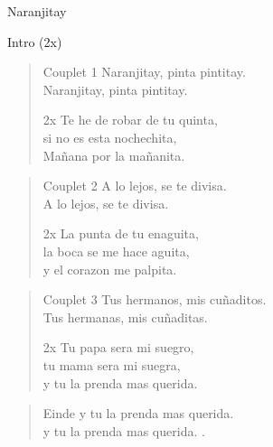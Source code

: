 \begin{song}[huayno]{Naranjitay}

\begin{instrumental}{Intro (2x)}
\measure{}\measure{}\measure{}\measure{}\measure{}\measure{}
\measure{}\measure{}
\end{instrumental}


\begin{verse}{Couplet 1}
Naranjitay, pinta pintitay.\\
Naranjitay, pinta pintitay.\\
\begin{sidenote}{2x}
Te he de robar de tu quinta,\\
si no es esta nochechita,\\
Mañana por la mañanita.\phantom{xxxx}
\end{sidenote}
\end{verse}


\begin{verse}{Couplet 2}
A lo lejos, se te divisa.\\
A lo lejos, se te divisa.\\
\begin{sidenote}{2x}
La punta de tu enaguita,\\
la boca se me hace aguita,\\
y el corazon me palpita.\phantom{xxxx}
\end{sidenote}
\end{verse}


\begin{verse}{Couplet 3}
Tus hermanos, mis cuñaditos. \\
Tus hermanas, mis cuñaditas. \\
\begin{sidenote}{2x}
Tu papa sera mi suegro,\\
tu mama sera mi suegra,\\
y tu la prenda mas querida.
\end{sidenote}
\end{verse}

\begin{verse}{Einde}
y tu la prenda mas querida.\\
y tu la prenda mas querida. \hspace{3em} \hspace{\wlskip} \hspace{\wlskip} \hspace{1em}.
\end{verse}
\end{song} 

